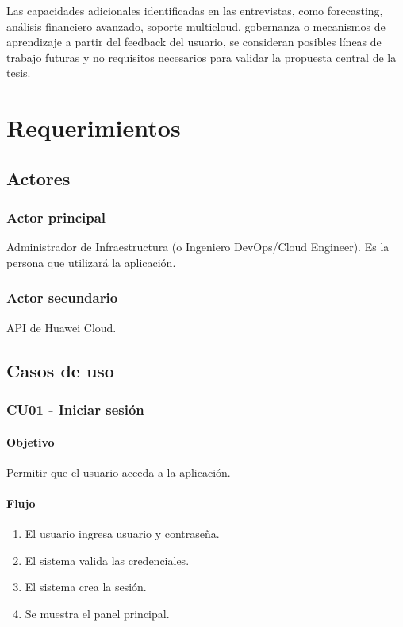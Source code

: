 Las capacidades adicionales identificadas en las entrevistas, como forecasting, análisis financiero avanzado, soporte multicloud, gobernanza o mecanismos de aprendizaje a partir del feedback del usuario, se consideran posibles líneas de trabajo futuras y no requisitos necesarios para validar la propuesta central de la tesis.

\section{Requerimientos}

\subsection{Actores}

\subsubsection*{Actor principal}

Administrador de Infraestructura (o Ingeniero DevOps/Cloud Engineer). Es la persona que utilizará la aplicación.

\subsubsection*{Actor secundario}

API de Huawei Cloud.

\subsection{Casos de uso}

\subsubsection{CU01 - Iniciar sesión}

\paragraph*{Objetivo}

Permitir que el usuario acceda a la aplicación.

\paragraph*{Flujo}

\begin{enumerate}
\item El usuario ingresa usuario y contraseña.
\item El sistema valida las credenciales.
\item El sistema crea la sesión.
\item Se muestra el panel principal.
\end{enumerate}

